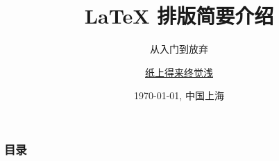 \documentclass[10pt, aspectratio=169]{ctexbeamer}
\title{ \LaTeX{} 排版简要介绍 }
\subtitle{从入门到放弃}
\author[Haiwen\,Zhang]{\href{mailto:haiwen.zhang@zju.edu.cn}{纸上得来终觉浅}}
\institute{数理学院数学系}
\date[\today]{\today, 中国上海}
\begin{document}
\begin{frame}[plain]
  \maketitle
\end{frame}

\begin{frame}[t]
  \frametitle{目录}
  \tableofcontents
\end{frame}










% 

\end{document}
